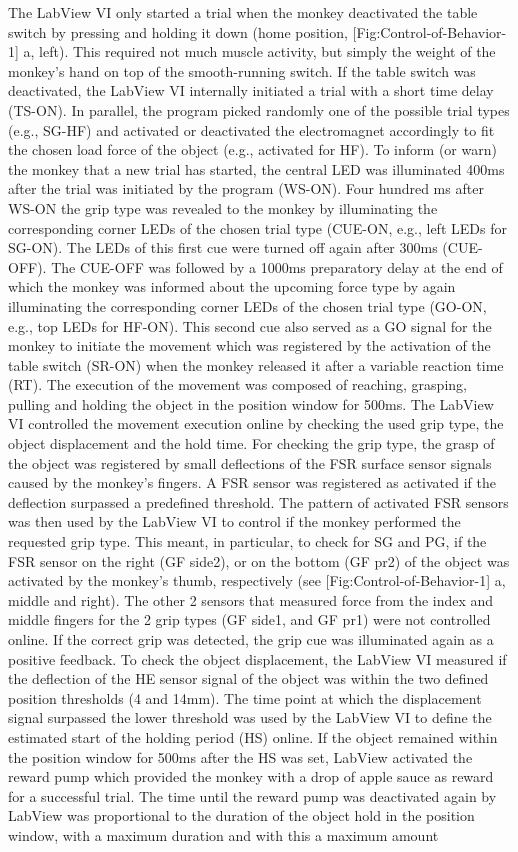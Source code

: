 {The LabView VI only started a trial when the monkey deactivated the table switch by pressing and holding it down (home position, [Fig:Control-of-Behavior-1] a, left). This required not much muscle activity, but simply the weight of the monkey's hand on top of the smooth-running switch. If the table switch was deactivated, the LabView VI internally initiated a trial with a short time delay (TS-ON). In parallel, the program picked randomly one of the possible trial types (e.g., SG-HF) and activated or deactivated the electromagnet accordingly to fit the chosen load force of the object (e.g., activated for HF). To inform (or warn) the monkey that a new trial has started, the central LED was illuminated 400ms after the trial was initiated by the program (WS-ON). Four hundred ms after WS-ON the grip type was revealed to the monkey by illuminating the corresponding corner LEDs of the chosen trial type (CUE-ON, e.g., left LEDs for SG-ON). The LEDs of this first cue were turned off again after 300ms (CUE-OFF). The CUE-OFF was followed by a 1000ms preparatory delay at the end of which the monkey was informed about the upcoming force type by again illuminating the corresponding corner LEDs of the chosen trial type (GO-ON, e.g., top LEDs for HF-ON). This second cue also served as a GO signal for the monkey to initiate the movement which was registered by the activation of the table switch (SR-ON) when the monkey released it after a variable reaction time (RT). The execution of the movement was composed of reaching, grasping, pulling and holding the object in the position window for 500ms. The LabView VI controlled the movement execution online by checking the used grip type, the object displacement and the hold time. For checking the grip type, the grasp of the object was registered by small deflections of the FSR surface sensor signals caused by the monkey's fingers. A FSR sensor was registered as activated if the deflection surpassed a predefined threshold. The pattern of activated FSR sensors was then used by the LabView VI to control if the monkey performed the requested grip type. This meant, in particular, to check for SG and PG, if the FSR sensor on the right (GF side2), or on the bottom (GF pr2) of the object was activated by the monkey's thumb, respectively (see [Fig:Control-of-Behavior-1] a, middle and right). The other 2 sensors that measured force from the index and middle fingers for the 2 grip types (GF side1, and GF pr1) were not controlled online. If the correct grip was detected, the grip cue was illuminated again as a positive feedback. To check the object displacement, the LabView VI measured if the deflection of the HE sensor signal of the object was within the two defined position thresholds (4 and 14mm). The time point at which the displacement signal surpassed the lower threshold was used by the LabView VI to define the estimated start of the holding period (HS) online. If the object remained within the position window for 500ms after the HS was set, LabView activated the reward pump which provided the monkey with a drop of apple sauce as reward for a successful trial. The time until the reward pump was deactivated again by LabView was proportional to the duration of the object hold in the position window, with a maximum duration and with this a maximum amount }
